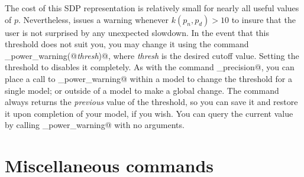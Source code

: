 \documentclass[12pt]{article}
\begin{document}
The cost of this SDP representation
is relatively small for nearly all useful values of $p$. Nevertheless,
\cvx issues a warning whenever $k(p_n,p_d)>10$ to insure that the user
is not surprised by any unexpected slowdown. In the event that this
threshold does not suit you, you may change it using the command
\verb@cvx_power_warning(@\emph{thresh}\verb@)@, where \emph{thresh}
is the desired cutoff value. Setting the
threshold to \verb@Inf@ disables it completely. 
As with the command \verb@cvx_precision@, you can place a
call to \verb@cvx_power_warning@ within a model
to change the threshold for a single model; or
outside of a model to make a global change. The command always
returns the \emph{previous}
value of the threshold, so you can save it and restore it upon completion
of your model, if you wish. You can query the current value
by calling \verb@cvx_power_warning@ with no arguments. 

\section{Miscellaneous \cvx commands}
\end{document}
